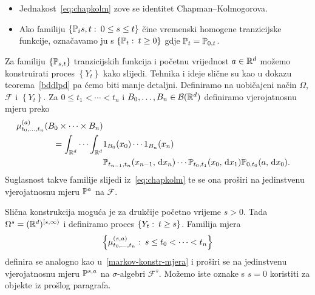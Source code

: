\documentclass[main.tex]{subfiles}
\begin{document}
\begin{komentar}
	\begin{itemize}
		\item Jednakost~\eqref{eq:chapkolm} zove se identitet Chapman--Kolmogorova.
		\item Ako familiju \( \{\Ptrans_i{s, t} \st 0 \le s \le t \} \) čine vremenski homogene tranzicijske funkcije, označavamo ju s \( \left\{ \Ptrans_t \st t \ge 0 \right\} \) gdje \( \Ptrans_t = \Ptrans_{0, t} \).
	\end{itemize}
\end{komentar}
\begin{komentar} \label{markov-konstr}
	Za familiju \( \left\{ \Ptrans_{s, t} \right\} \) tranzicijskih funkcija i početnu vrijednost \( a \in \R^d \) možemo konstruirati proces \( \left\{ Y_t \right\} \) kako slijedi. Tehnika i ideje slične su
	kao u dokazu teorema~\ref{bddlpd} pa ćemo biti manje detaljni. Definiramo na uobičajeni način \( \Omega \), \( \mathcal F \) i \( \left\{ Y_t \right\} \). Za \( 0 \le t_1 < \cdots < t_n \) i \( B_0, \ldots, B_n \in \mathcal B(\R^d) \) definiramo vjerojatnosnu mjeru preko
	\begin{equation} \label{markov-konstr-mjera}
		\begin{aligned}
			\mu_{t_0, \ldots, t_n}^{(a)}(B_0  \times \cdots \times B_n)                       \\
			= \int_{\R^d} \cdots \int_{\R^d} & 1_{B_0}(x_0)\cdots 1_{B_n}(x_n)                \\
			                                 & \Ptrans_{t_{n-1}, t_n}(x_{n-1}, \D x_n) \cdots
			\Ptrans_{t_0, t_1}(x_0, \D x_1) \Ptrans_{0, t_0}(a, \D x_0).
		\end{aligned}
	\end{equation}
	Suglasnost takve familije slijedi iz~\eqref{eq:chapkolm} te se ona proširi na jedinstvenu vjerojatnosnu mjeru \( \Ptrans^{a} \) na \( \mathcal F \).

	Slična konstrukcija moguća je za drukčije početno vrijeme \( s > 0 \). Tada \( \Omega^s = (\R^d)^{\left[ s, \infty \right\rangle} \) i definiramo proces \( \left\{ Y_t \st t \ge s \right\} \).
	Familija mjera \[ \left\{ \mu^{(s,a)}_{t_0,\ldots,t_n} \st s \le t_0 < \cdots < t_n \right\} \]
	definira se analogno kao u~\eqref{markov-konstr-mjera} i proširi se na jedinstvenu vjerojatnosnu mjeru \( \P^{s,a} \) na \( \sigma \)-algebri \( \mathcal F^s \).
	Možemo iste oznake s \( s=0 \) koristiti za objekte iz prošlog paragrafa.
\end{komentar}
\end{document}

